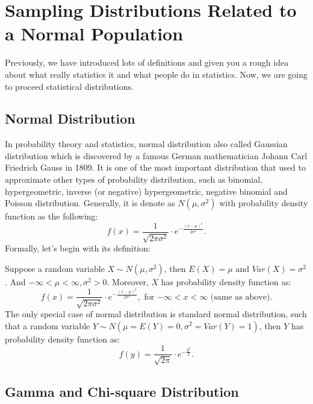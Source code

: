 \chapter{Sampling Distributions Related to a Normal Population}

Previously, we have introduced lots of definitions and given you a rough idea about what really statistics it and what people do in statistics. Now, we are going to proceed statistical distributions. 

\section{Normal Distribution}

In probability theory and statistics, normal distribution also called Gaussian distribution which is discovered by a famous German mathematician Johann Carl Friedrich Gauss in 1809. It is one of the most important distribution that used to approximate other types of probability distribution, such as binomial, hypergeometric, inverse (or negative) hypergeometric, negative binomial and Poisson distribution. Generally, it is denote as $N(\mu, \sigma^2)$ with probability density function as the following: \[ f(x) = \frac{1}{\sqrt{2 \pi \sigma^2}} \cdot e^{-\frac{(x - \mu)^2}{2\sigma^2}}.\]
Formally, let's begin with its definition:

\begin{definition}
Suppose a random variable $X \sim N(\mu, \sigma^2)$, then $E(X) = \mu \text{ and } Var(X) = \sigma^2$. And $-\infty < \mu < \infty, \sigma^2 > 0.$ Moreover, $X$ has probability density function as: \[ f(x) = \frac{1}{\sqrt{2 \pi \sigma^2}} \cdot e^{-\frac{(x - \mu)^2}{2\sigma^2}}, \text{ for $-\infty < x < \infty$ (same as above).}\]
The only special case of normal distribution is standard normal distribution, such that a random variable $Y \sim N( \mu = E(Y) = 0, \sigma^2 = Var(Y) = 1)$, then $Y$ has probability density function as: \[ f(y) = \frac{1}{\sqrt{2\pi}} \cdot e^{-\frac{y^2}{2}}.\]
\end{definition}

\section{Gamma and Chi-square Distribution}


